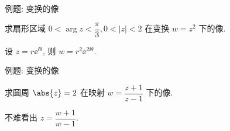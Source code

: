 \begin{frame}{例题: 变换的像}
	\onslide<+->
	\begin{example}[nearnext]
		求扇形区域 $0<\arg z<\dfrac\pi3,0<|z|<2$ 在变换 $w=z^2$ 下的像.
	\end{example}
	\onslide<+->
	\begin{solution}[nearprev]
		设 $z=r\ee^{\ii\theta}$, 则 $w=r^2\ee^{2\ii\theta}$.
		\bigdel
	\end{solution}
\end{frame}


\begin{frame}{例题: 变换的像}
	\onslide<+->
	\begin{example}[nearnext]
		求圆周 $\abs{z}=2$ 在映射 $w=\dfrac{z+1}{z-1}$ 下的像.
	\end{example}
	\onslide<+->
	\begin{solution}[nearprev]
		不难看出 $z=\dfrac{w+1}{w-1}$.
		\onslide<+->{%
			\[
				w\ov w-\dfrac53 w-\dfrac53\ov w+1=0.
			\]
		}\meddel
	\end{solution}
\end{frame}


